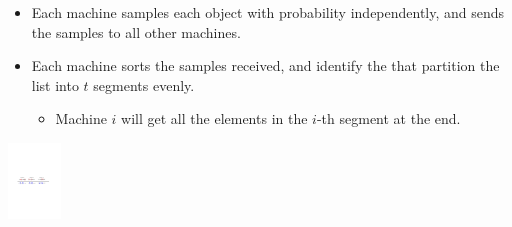 \documentclass{beamer}
\def\vgap{\vspace{5mm}}
\begin{document}
\begin{frame}
\begin{small}
    
    \vgap 
    
    
    
    \begin{itemize} 
        \item {} Each machine samples each object with probability  independently, and sends the samples to all other machines. 
        
        \item {} Each machine sorts the samples received, and identify the  that partition the list into $t$ segments evenly.  
        \begin{itemize} 
            \item Machine $i$ will get all the elements in the $i$-th segment at the end.
        \end{itemize} 
    \end{itemize}

    \vgap
        
    \begin{center} 
        \includegraphics[height=20mm]{./artwork/tera} 
    \end{center}
\end{small}
\end{frame}
\end{document}
